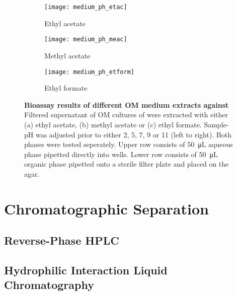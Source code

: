 \begin{figure}[htbp]
	\centering
	\begin{subfigure}{\textwidth}
		\texttt{[image: medium\_ph\_etac]}
		\caption{Ethyl acetate}
	\end{subfigure}
	\begin{subfigure}{\textwidth}
		\texttt{[image: medium\_ph\_meac]}
		\caption{Methyl acetate}
	\end{subfigure}
	\begin{subfigure}{\textwidth}
		\texttt{[image: medium\_ph\_etform]}
		\caption{Ethyl formate}
	\end{subfigure}
	\caption[Bioassay results of different OM medium extracts against \coli]{%
		\textbf{Bioassay results of different OM medium extracts against \coli} Filtered supernatant of OM cultures of \tue
    were extracted with either (a) ethyl acetate, (b) methyl acetate or (c) ethyl formate. Sample-pH was adjusted prior
    to either 2, 5, 7, 9 or 11 (left to right). Both phases were tested seperately. Upper row consists of
    \SI{50}{\micro\liter} aqueous phase pipetted directly into wells. Lower row consists of \SI{50}{\micro\liter}
    organic phase pipetted onto a sterile filter plate and placed on the agar.}
	\label{fig:results_extraction_bioassay}
\end{figure}



\section{Chromatographic Separation} %
\label{sec:results_chromatographic_separation}

\subsection{Reverse-Phase HPLC} %
\label{sub:results_reverse_phase_hplc}


\subsection{Hydrophilic Interaction Liquid Chromatography} %
\label{sub:results_hydrophilic_interaction_chromatography}

